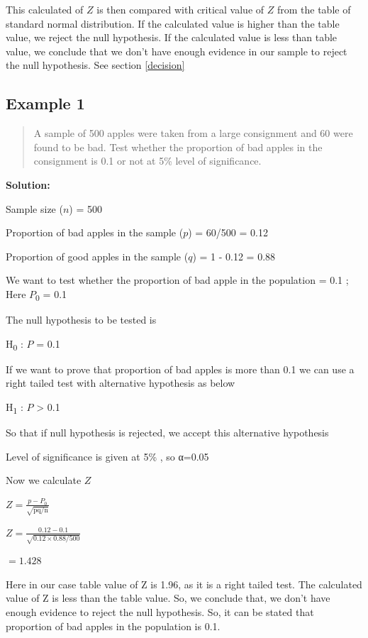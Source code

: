 \documentclass[
]{book}
\begin{document}
This calculated of \(Z\) is then compared with critical
value of \(Z\) from the table of standard normal distribution. If the calculated value is higher than the table value, we reject the null hypothesis. If the calculated value is less than table value, we conclude that we don't have enough evidence in our sample to reject the null hypothesis. See section \ref{decision}

\hypertarget{example-1-1}{%
\subsection*{Example 1}\label{example-1-1}}

\begin{quote}
A sample of 500 apples were taken from a large consignment and 60 were found to be bad. Test whether the proportion of bad apples in the consignment is 0.1 or not at 5\% level of significance.
\end{quote}

\textbf{Solution:}

Sample size (\(n\)) = 500

Proportion of bad apples in the sample (\(p\)) = 60/500 = 0.12

Proportion of good apples in the sample (\(q\)) = 1 - 0.12 = 0.88

We want to test whether the proportion of bad apple in the population =
0.1 ; Here \(P\)\textsubscript{0} = 0.1

The null hypothesis to be tested is

H\textsubscript{0} : \(P\) = 0.1

If we want to prove that proportion of bad apples is more than 0.1 we
can use a right tailed test with alternative hypothesis as below

H\textsubscript{1} : \(P\) \textgreater{} 0.1

So that if null hypothesis is rejected, we accept this alternative hypothesis

Level of significance is given at 5\% , so α=0.05

Now we calculate \(Z\)

\(Z = \frac{p - P_{0}}{\sqrt{\text{pq/n}}}\)

\(Z = \frac{0.12 - 0.1}{\sqrt{0.12 \times 0.88/500}}\)

\(= 1.428\)

Here in our case table value of Z is 1.96, as it is a right tailed test. The calculated value of Z is less than the table value. So, we conclude that, we don't have enough evidence to reject the null hypothesis. So, it can be stated that proportion of bad apples in the population is 0.1.
\end{document}
